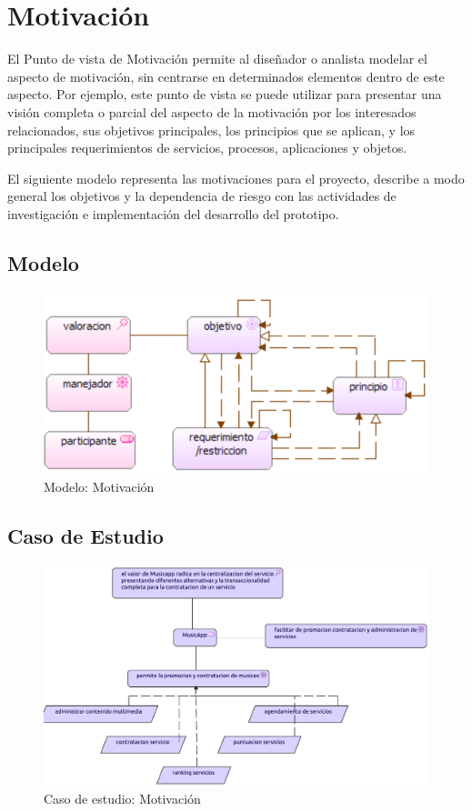 \newpage

\section{Motivación}
El Punto de vista de Motivación permite al diseñador o analista modelar el aspecto de motivación, sin centrarse en determinados elementos dentro de este aspecto. Por ejemplo, este punto de vista se puede utilizar para presentar una visión completa o parcial del aspecto de la motivación por los interesados relacionados, sus objetivos principales, los principios que se aplican, y los principales requerimientos de servicios, procesos, aplicaciones y objetos. \cite{ArchiMat55:online} \vspace{\baselineskip}

El siguiente modelo representa las motivaciones para el proyecto, describe a modo general los objetivos y la dependencia de riesgo con las actividades de investigación e implementación del desarrollo del prototipo.

\subsection{Modelo}
\begin{figure}[h!]
	\centering
	\includegraphics[width=0.8\linewidth]{Arquitectura/Motivacion/imgs/MotivacionMetamodelo.PNG}
	\caption{Modelo:  Motivación}
\end{figure}
\newpage
\subsection{Caso de Estudio}
\begin{figure}[h!]
	\centering
	\includegraphics[width=\linewidth]{Arquitectura/Motivacion/imgs/Motivacion.pdf}
	\caption{Caso de estudio: Motivación}
	\label{fig:comportamiento}
\end{figure}

\newpage

